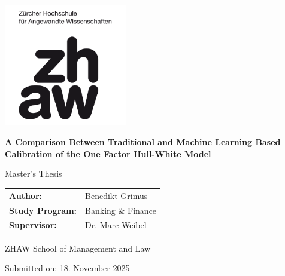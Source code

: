 \documentclass[12pt,a4paper]{article}
\begin{document}
\begin{titlepage}
    \centering
    \vspace*{1cm}
    
    
    \includegraphics[width=0.4\textwidth]{images/zhaw_logo.png}
    
    \vfill %
    
    {\Huge\bfseries A Comparison Between Traditional and Machine Learning Based Calibration of the One Factor Hull-White Model\par}
    
    \vspace{1.5cm}
    
    {\Large Master's Thesis\par}
    
    \vfill %
    
    \begin{minipage}{0.8\textwidth}
        \large
        \begin{tabular}{@{}ll}
            \textbf{Author:} & Benedikt Grimus \\
            \addlinespace[1em]
            \textbf{Study Program:} & Banking \& Finance \\
            \addlinespace[1em]
            \textbf{Supervisor:} & Dr. Marc Weibel \\
        \end{tabular}
    \end{minipage}
    
    \vfill %
    
    {\large
    ZHAW School of Management and Law\par
    Submitted on: 18. November 2025\par
    }
    
    \vspace*{1cm}

\end{titlepage}
\end{document}
